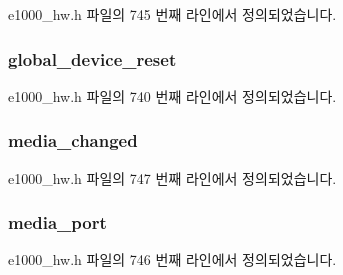 e1000\+\_\+hw.\+h 파일의 745 번째 라인에서 정의되었습니다.

\subsubsection[{\texorpdfstring{global\+\_\+device\+\_\+reset}{global_device_reset}}]{ global\+\_\+device\+\_\+reset}\hypertarget{structe1000__dev__spec__82575_abb7ee4a2b47a7aed417b505985e648e4}{}\label{structe1000__dev__spec__82575_abb7ee4a2b47a7aed417b505985e648e4}


e1000\+\_\+hw.\+h 파일의 740 번째 라인에서 정의되었습니다.

\subsubsection[{\texorpdfstring{media\+\_\+changed}{media_changed}}]{ media\+\_\+changed}\hypertarget{structe1000__dev__spec__82575_ab7ad55be07202708d12927b26dcce99c}{}\label{structe1000__dev__spec__82575_ab7ad55be07202708d12927b26dcce99c}


e1000\+\_\+hw.\+h 파일의 747 번째 라인에서 정의되었습니다.

\subsubsection[{\texorpdfstring{media\+\_\+port}{media_port}}]{ media\+\_\+port}\hypertarget{structe1000__dev__spec__82575_afad32bd92d6ecd9161275120de8b793d}{}\label{structe1000__dev__spec__82575_afad32bd92d6ecd9161275120de8b793d}


e1000\+\_\+hw.\+h 파일의 746 번째 라인에서 정의되었습니다.

